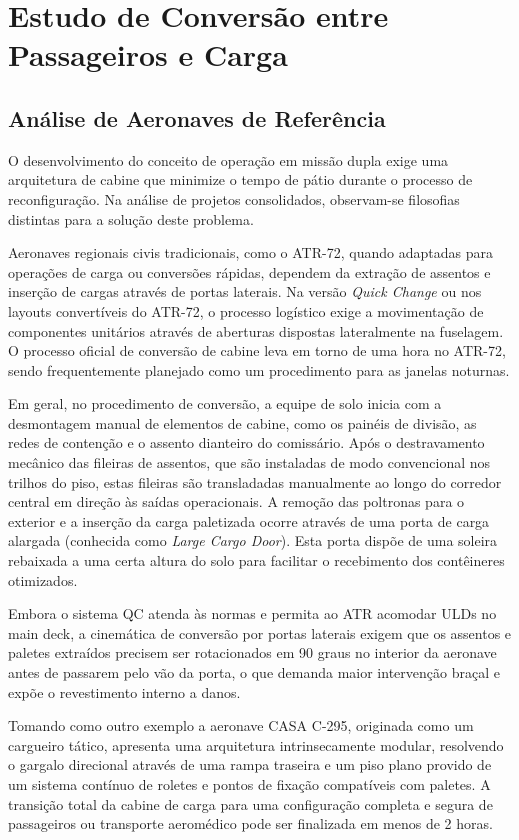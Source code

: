 \section{Estudo de Conversão entre Passageiros e Carga}

\subsection{Análise de Aeronaves de Referência}

O desenvolvimento do conceito de operação em missão dupla exige uma arquitetura de cabine que minimize o tempo de pátio durante o processo de reconfiguração. Na análise de projetos consolidados, observam-se filosofias distintas para a solução deste problema.

Aeronaves regionais civis tradicionais, como o ATR-72, quando adaptadas para operações de carga ou conversões rápidas, dependem da extração de assentos e inserção de cargas através de portas laterais. Na versão \textit{Quick Change} ou nos layouts convertíveis do ATR-72, o processo logístico exige a movimentação de componentes unitários através de aberturas dispostas lateralmente na fuselagem. O processo oficial de conversão de cabine leva em torno de uma hora no ATR-72, sendo frequentemente planejado como um procedimento para as janelas noturnas.

Em geral, no procedimento de conversão, a equipe de solo inicia com a desmontagem manual de elementos de cabine, como os painéis de divisão, as redes de contenção e o assento dianteiro do comissário. Após o destravamento mecânico das fileiras de assentos, que são instaladas de modo convencional nos trilhos do piso, estas fileiras são transladadas manualmente ao longo do corredor central em direção às saídas operacionais. A remoção das poltronas para o exterior e a inserção da carga paletizada ocorre através de uma porta de carga alargada (conhecida como \textit{Large Cargo Door}). Esta porta dispõe de uma soleira rebaixada a uma certa altura do solo para facilitar o recebimento dos contêineres otimizados.  

Embora o sistema QC atenda às normas e permita ao ATR acomodar ULDs no main deck, a cinemática de conversão por portas laterais exigem que os assentos e paletes extraídos precisem ser rotacionados em 90 graus no interior da aeronave antes de passarem pelo vão da porta, o que demanda maior intervenção braçal e expõe o revestimento interno a danos.

Tomando como outro exemplo a aeronave CASA C-295, originada como um cargueiro tático, apresenta uma arquitetura intrinsecamente modular, resolvendo o gargalo direcional através de uma rampa traseira e um piso plano provido de um sistema contínuo de roletes e pontos de fixação compatíveis com paletes. A transição total da cabine de carga para uma configuração completa e segura de passageiros ou transporte aeromédico pode ser finalizada em menos de 2 horas.

